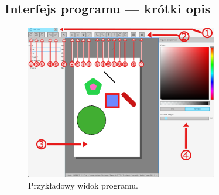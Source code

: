 \documentclass[a4paper,12pt]{article}
\begin{document}
\subsection{Interfejs programu — krótki opis}

\begin{figure}[h!]
    \centering
    \includegraphics[width=0.75\textwidth]{./vecedit_screenshot.png}
    \caption{Przykładowy widok programu.}
    \label{fig:screenshot}
\end{figure}
\end{document}
